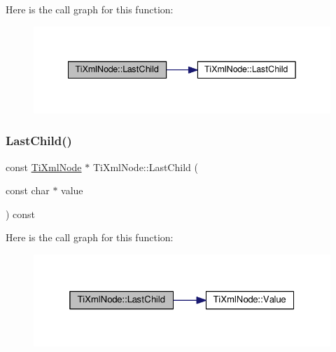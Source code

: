 Here is the call graph for this function\+:\nopagebreak
\begin{figure}[H]
\begin{center}
\leavevmode
\includegraphics[width=342pt]{class_ti_xml_node_a6432d2b2495f6caf9cb4278df706a031_cgraph}
\end{center}
\end{figure}
\mbox{\label{class_ti_xml_node_afdd7b6ba456fdd570610c1d841f91eb3}} 
\subsubsection{\texorpdfstring{Last\+Child()}{LastChild()}\hspace{0.1cm}{\footnotesize\ttfamily [3/4]}}
{\footnotesize\ttfamily const \hyperlink{class_ti_xml_node}{Ti\+Xml\+Node} $\ast$ Ti\+Xml\+Node\+::\+Last\+Child (\begin{DoxyParamCaption}\item[{const char $\ast$}]{value }\end{DoxyParamCaption}) const}

Here is the call graph for this function\+:\nopagebreak
\begin{figure}[H]
\begin{center}
\leavevmode
\includegraphics[width=325pt]{class_ti_xml_node_afdd7b6ba456fdd570610c1d841f91eb3_cgraph}
\end{center}
\end{figure}
\mbox{\label{class_ti_xml_node_abad5bf1059c48127b958711ef89e8e5d}} 
